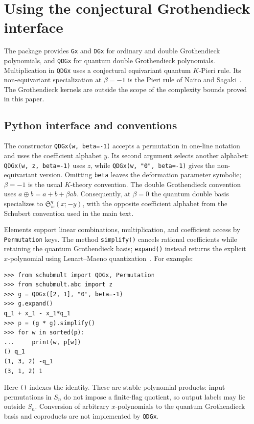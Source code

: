 \documentclass{amsart}
\theoremstyle{definition}
\theoremstyle{remark}
\numberwithin{equation}{section}
\newcommand{\Sch}{\mathfrak S}
\begin{document}
\appendix
\section{Using the conjectural Grothendieck interface}\label{app:grothendieck}

The package provides \texttt{Gx} and \texttt{DGx} for ordinary and double
Grothendieck polynomials, and \texttt{QDGx} for quantum double
Grothendieck polynomials. Multiplication in \texttt{QDGx} uses a
conjectural equivariant quantum $K$-Pieri rule. Its non-equivariant
specialization at $\beta=-1$ is the Pieri rule of Naito and
Sagaki~\cite{naito2024pieri}. The Grothendieck kernels are outside the
scope of the complexity bounds proved in this paper.

\subsection{Python interface and conventions}

The constructor \texttt{QDGx(w, beta=-1)} accepts a permutation in
one-line notation and uses the coefficient alphabet $y$.
Its second argument selects another alphabet:
\texttt{QDGx(w, z, beta=-1)} uses $z$, while
\texttt{QDGx(w, "0", beta=-1)} gives the non-equivariant version.
Omitting \texttt{beta} leaves the deformation parameter symbolic;
$\beta=-1$ is the usual $K$-theory convention.
The double Grothendieck convention uses
$a\oplus b=a+b+\beta ab$. Consequently, at $\beta=0$ the quantum double
basis specializes to $\Sch_w^q(x;-y)$, with the opposite coefficient
alphabet from the Schubert convention used in the main text.

Elements support linear combinations, multiplication, and coefficient
access by \texttt{Permutation} keys. The method \texttt{simplify()}
cancels rational coefficients while retaining the quantum
Grothendieck basis; \texttt{expand()} instead returns the explicit
$x$-polynomial using Lenart--Maeno quantization~\cite{lenart2006quantum}.
For example:
\begin{verbatim}
>>> from schubmult import QDGx, Permutation
>>> from schubmult.abc import z
>>> g = QDGx([2, 1], "0", beta=-1)
>>> g.expand()
q_1 + x_1 - x_1*q_1
>>> p = (g * g).simplify()
>>> for w in sorted(p):
...     print(w, p[w])
() q_1
(1, 3, 2) -q_1
(3, 1, 2) 1
\end{verbatim}
Here \texttt{()} indexes the identity. These are stable polynomial
products: input permutations in $S_n$ do not impose a finite-flag
quotient, so output labels may lie outside $S_n$.
Conversion of arbitrary $x$-polynomials to the quantum Grothendieck
basis and coproducts are not implemented by \texttt{QDGx}.
\end{document}
